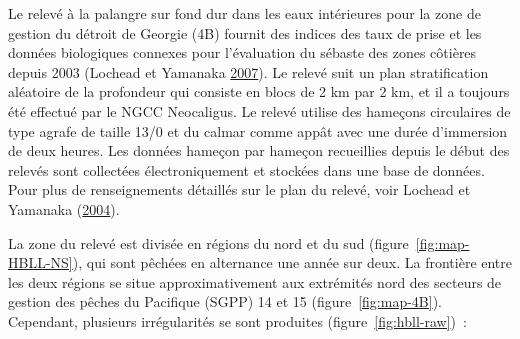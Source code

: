 \documentclass[french,11pt]{book}
\begin{document}
Le relevé à la palangre sur fond dur dans les eaux intérieures pour la zone de gestion du détroit de Georgie (4B) fournit des indices des taux de prise et les données biologiques connexes pour l'évaluation du sébaste des zones côtières depuis 2003 (Lochead et Yamanaka \protect\hyperlink{ref-lochead2007}{2007}). Le relevé suit un plan stratification aléatoire de la profondeur qui consiste en blocs de 2 km par 2 km, et il a toujours été effectué par le NGCC Neocaligus. Le relevé utilise des hameçons circulaires de type agrafe de taille 13/0 et du calmar comme appât avec une durée d'immersion de deux heures. Les données hameçon par hameçon recueillies depuis le début des relevés sont collectées électroniquement et stockées dans une base de données. Pour plus de renseignements détaillés sur le plan du relevé, voir Lochead et Yamanaka (\protect\hyperlink{ref-lochead2004}{2004}).

La zone du relevé est divisée en régions du nord et du sud (figure~\ref{fig:map-HBLL-NS}), qui sont pêchées en alternance une année sur deux. La frontière entre les deux régions se situe approximativement aux extrémités nord des secteurs de gestion des pêches du Pacifique (SGPP) 14 et 15 (figure~\ref{fig:map-4B}). Cependant, plusieurs irrégularités se sont produites (figure~\ref{fig:hbll-raw})~:
\end{document}
